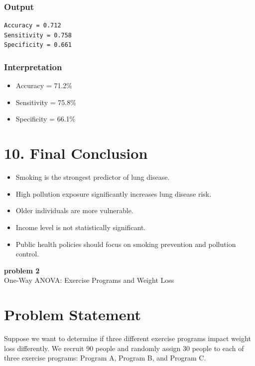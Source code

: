 \documentclass[12pt]{article}
\begin{document}
\subsubsection*{Output}

\begin{verbatim}
Accuracy = 0.712
Sensitivity = 0.758
Specificity = 0.661
\end{verbatim}

\subsubsection*{Interpretation}

\begin{itemize}
\item Accuracy = 71.2\%
\item Sensitivity = 75.8\%
\item Specificity = 66.1\%
\end{itemize}

\section*{10. Final Conclusion}

\begin{itemize}
\item Smoking is the strongest predictor of lung disease.
\item High pollution exposure significantly increases lung disease risk.
\item Older individuals are more vulnerable.
\item Income level is not statistically significant.
\item Public health policies should focus on smoking prevention and pollution control.
\end{itemize}

\newpage

\begin{center}
    {\LARGE \textbf{ problem 2}}\\[0.3cm]
    {\large One-Way ANOVA: Exercise Programs and Weight Loss}
\end{center}




\section*{Problem Statement}

Suppose we want to determine if three different exercise programs impact weight loss differently. We recruit 90 people and randomly assign 30 people to each of three exercise programs: Program A, Program B, and Program C.
\end{document}
